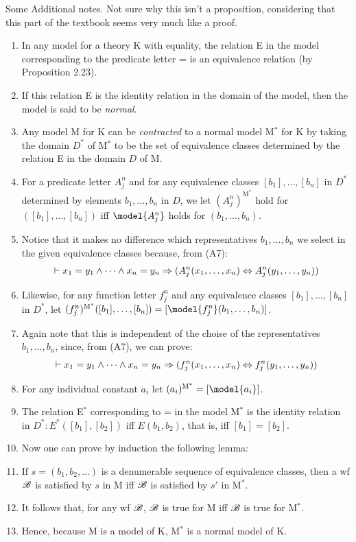 Some Additional notes. Not sure why this isn't a proposition, considering that this part of the textbook seems very much like a proof.

\begin{enumerate}
    \item In any model for a theory K with equality, the relation E in the model corresponding to the predicate letter = is an equivalence relation (by Proposition 2.23).
    \item If this relation E is the identity relation in the domain of the model, then the model is said to be \textit{normal}.
    \item Any model M for K can be \textit{contracted} to a normal model M$^*$ for K by taking the domain $D^*$ of M$^*$ to be the set of equivalence classes determined by the relation E in the domain $D$ of M.
    \item For a predicate letter $A_j^n$ and for any equivalence classes $[b_1], \dots, [b_n]$ in $D^*$ determined by elements $b_1, \dots, b_n$ in $D$, we let $(A_j^n)^{\text{M}^*}$ hold for $([b_1], \dots, [b_n])$ iff $\model{A_j^n}$ holds for $(b_1, \dots, b_n)$.
    \item Notice that it makes no difference which representatives $b_1, \dots, b_n$ we select in the given equivalence classes because, from (A7):
    \[
    \vdash x_1=y_1 \land \dots \land x_n = y_n \Rightarrow (A_j^n(x_1, \dots, x_n) \Leftrightarrow A_j^n(y_1, \dots, y_n))
    \]
    \item Likewise, for any function letter $f_j^n$ and any equivalence classes $[b_1], \dots, [b_n]$ in $D^*$, let $(f_j^n)^{\text{M}^*}([b_1], \dots, [b_n])=[\model{f_j^n}(b_1, \dots, b_n)]$.
    \item Again note that this is independent of the choise of the representatives $b_1, \dots, b_n$, since, from (A7), we can prove:
    \[
    \vdash x_1=y_1 \land \dots \land x_n = y_n \Rightarrow (f_j^n(x_1, \dots, x_n) \Leftrightarrow f_j^n(y_1, \dots, y_n))
    \]
    \item For any individual constant $a_i$ let $(a_i)^{\text{M}^*}=[\model{a_i}]$.
    \item The relation E$^*$ corresponding to = in the model M$^*$ is the identity relation in $D^*:E^*([b_1],[b_2])$ iff $E(b_1,b_2)$, that is, iff $[b_1]=[b_2]$.
    \item Now one can prove by induction the following lemma:
    \item If $s=(b_1, b_2, \dots)$ is a denumerable sequence of equivalence classes, then a wf $\mathscr{B}$ is satisfied by $s$ in M iff $\mathscr{B}$ is satisfied by $s'$ in M$^*$.
    \item It follows that, for any wf $\mathscr{B}$, $\mathscr{B}$ is true for M iff $\mathscr{B}$ is true for M$^*$.
    \item Hence, because M is a model of K, M$^*$ is a normal model of K.
\end{enumerate} \\


